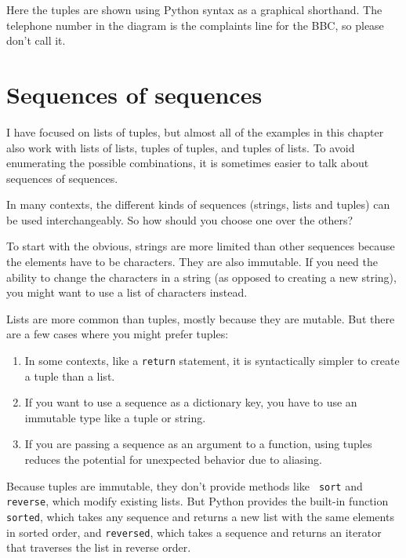 \documentclass[10pt]{book}
\begin{document}
Here the tuples are shown using Python syntax as a graphical
shorthand.  The telephone number in the diagram is the complaints line
for the BBC, so please don't call it.


\section{Sequences of sequences}

I have focused on lists of tuples, but almost all of the examples in
this chapter also work with lists of lists, tuples of tuples, and
tuples of lists.  To avoid enumerating the possible combinations, it
is sometimes easier to talk about sequences of sequences.

In many contexts, the different kinds of sequences (strings, lists and
tuples) can be used interchangeably.  So how should you choose one
over the others?

To start with the obvious, strings are more limited than other
sequences because the elements have to be characters.  They are
also immutable.  If you need the ability to change the characters
in a string (as opposed to creating a new string), you might
want to use a list of characters instead.

Lists are more common than tuples, mostly because they are mutable.
But there are a few cases where you might prefer tuples:

\begin{enumerate}

\item In some contexts, like a {\tt return} statement, it is
syntactically simpler to create a tuple than a list.

\item If you want to use a sequence as a dictionary key, you
have to use an immutable type like a tuple or string.

\item If you are passing a sequence as an argument to a function,
using tuples reduces the potential for unexpected behavior
due to aliasing.

\end{enumerate}

Because tuples are immutable, they don't provide methods like {\tt
  sort} and {\tt reverse}, which modify existing lists.  But Python
provides the built-in function {\tt sorted}, which takes any sequence
and returns a new list with the same elements in sorted order, and
{\tt reversed}, which takes a sequence and returns an iterator that
traverses the list in reverse order.
 
\end{document}
